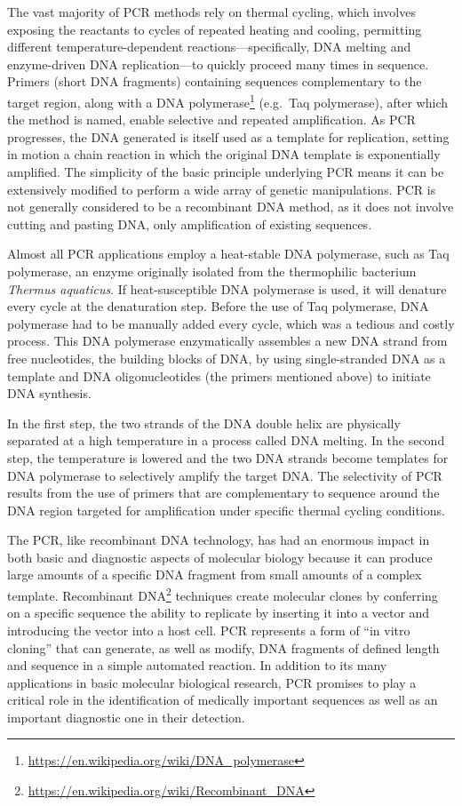\documentclass[]{book}
\let\rmarkdownfootnote\footnote%
\def\footnote{\protect\rmarkdownfootnote}
\renewcommand{\href}[2]{#2\footnote{\url{#1}}}
\theoremstyle{definition}
\theoremstyle{definition}
\theoremstyle{definition}
\theoremstyle{remark}
\begin{document}
The vast majority of PCR methods rely on thermal cycling, which involves
exposing the reactants to cycles of repeated heating and cooling,
permitting different temperature-dependent reactions---specifically, DNA
melting and enzyme-driven DNA replication---to quickly proceed many
times in sequence. Primers (short DNA fragments) containing sequences
complementary to the target region, along with a
\href{https://en.wikipedia.org/wiki/DNA_polymerase}{DNA polymerase}
(e.g.~Taq polymerase), after which the method is named, enable selective
and repeated amplification. As PCR progresses, the DNA generated is
itself used as a template for replication, setting in motion a chain
reaction in which the original DNA template is exponentially amplified.
The simplicity of the basic principle underlying PCR means it can be
extensively modified to perform a wide array of genetic manipulations.
PCR is not generally considered to be a recombinant DNA method, as it
does not involve cutting and pasting DNA, only amplification of existing
sequences.

Almost all PCR applications employ a heat-stable DNA polymerase, such as
Taq polymerase, an enzyme originally isolated from the thermophilic
bacterium \emph{Thermus aquaticus}. If heat-susceptible DNA polymerase
is used, it will denature every cycle at the denaturation step. Before
the use of Taq polymerase, DNA polymerase had to be manually added every
cycle, which was a tedious and costly process. This DNA polymerase
enzymatically assembles a new DNA strand from free nucleotides, the
building blocks of DNA, by using single-stranded DNA as a template and
DNA oligonucleotides (the primers mentioned above) to initiate DNA
synthesis.

In the first step, the two strands of the DNA double helix are
physically separated at a high temperature in a process called DNA
melting. In the second step, the temperature is lowered and the two DNA
strands become templates for DNA polymerase to selectively amplify the
target DNA. The selectivity of PCR results from the use of primers that
are complementary to sequence around the DNA region targeted for
amplification under specific thermal cycling conditions.

The PCR, like recombinant DNA technology, has had an enormous impact in
both basic and diagnostic aspects of molecular biology because it can
produce large amounts of a specific DNA fragment from small amounts of a
complex template.
\href{https://en.wikipedia.org/wiki/Recombinant_DNA}{Recombinant DNA}
techniques create molecular clones by conferring on a specific sequence
the ability to replicate by inserting it into a vector and introducing
the vector into a host cell. PCR represents a form of ``in vitro
cloning'' that can generate, as well as modify, DNA fragments of defined
length and sequence in a simple automated reaction. In addition to its
many applications in basic molecular biological research, PCR promises
to play a critical role in the identification of medically important
sequences as well as an important diagnostic one in their detection.
\end{document}
